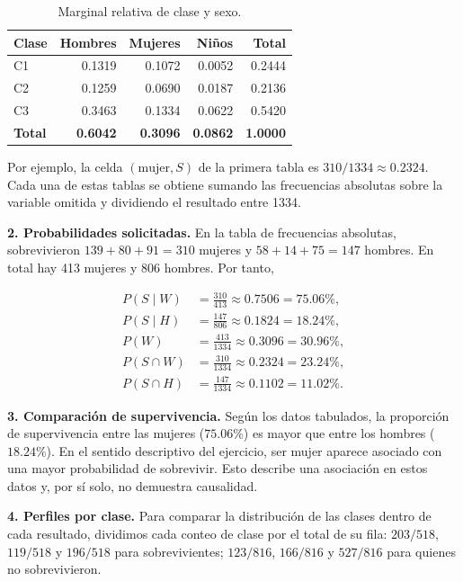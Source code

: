 \documentclass[12pt]{article}
\begin{document}
\begin{table}[H]
\centering
\small
\renewcommand{\arraystretch}{1.15}
\begin{tabular}{|l|r|r|r|r|}
\hline
\textbf{Clase} & \textbf{Hombres} & \textbf{Mujeres} & \textbf{Niños} & \textbf{Total} \\ \hline
C1 & 0.1319 & 0.1072 & 0.0052 & 0.2444 \\ \hline
C2 & 0.1259 & 0.0690 & 0.0187 & 0.2136 \\ \hline
C3 & 0.3463 & 0.1334 & 0.0622 & 0.5420 \\ \hline
\textbf{Total} & \textbf{0.6042} & \textbf{0.3096} & \textbf{0.0862} & \textbf{1.0000} \\ \hline
\end{tabular}
\caption{Marginal relativa de clase y sexo.}
\label{tab:titanic-marginal-clase-sexo}
\end{table}

Por ejemplo, la celda $(\text{mujer},S)$ de la primera tabla es $310/1334\approx0.2324$. Cada una de estas tablas se obtiene sumando las frecuencias absolutas sobre la variable omitida y dividiendo el resultado entre 1334.

\textbf{2. Probabilidades solicitadas.} En la tabla de frecuencias absolutas, sobrevivieron $139+80+91=310$ mujeres y $58+14+75=147$ hombres. En total hay 413 mujeres y 806 hombres. Por tanto,

\begin{align*}
P(S\mid W)&=\frac{310}{413}\approx0.7506=75.06\%,\\
P(S\mid H)&=\frac{147}{806}\approx0.1824=18.24\%,\\
P(W)&=\frac{413}{1334}\approx0.3096=30.96\%,\\
P(S\cap W)&=\frac{310}{1334}\approx0.2324=23.24\%,\\
P(S\cap H)&=\frac{147}{1334}\approx0.1102=11.02\%.
\end{align*}

\textbf{3. Comparación de supervivencia.} Según los datos tabulados, la proporción de supervivencia entre las mujeres ($75.06\%$) es mayor que entre los hombres ($18.24\%$). En el sentido descriptivo del ejercicio, ser mujer aparece asociado con una mayor probabilidad de sobrevivir. Esto describe una asociación en estos datos y, por sí solo, no demuestra causalidad.

\textbf{4. Perfiles por clase.} Para comparar la distribución de las clases dentro de cada resultado, dividimos cada conteo de clase por el total de su fila: $203/518$, $119/518$ y $196/518$ para sobrevivientes; $123/816$, $166/816$ y $527/816$ para quienes no sobrevivieron.
\end{document}
